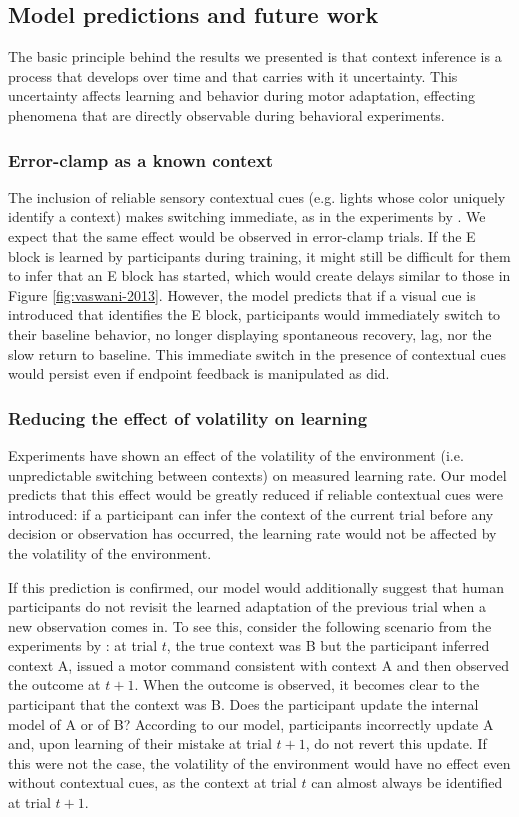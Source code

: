 \documentclass[a4paper,doc,floatsintext,natbib]{apa6}%
\def \fref #1{Figure \ref{#1}}     %
\begin{document}
\subsection{Model predictions and future work}
The basic principle behind the results we presented is that context inference is a process that develops over time and that carries with it uncertainty. This uncertainty affects learning and behavior during motor adaptation, effecting phenomena that are directly observable during behavioral experiments.

\subsubsection{Error-clamp as a known context}
The inclusion of reliable sensory contextual cues (e.g. lights whose color uniquely identify a context) makes switching immediate, as in the experiments by \cite{Kim_Neural_2015}. We expect that the same effect would be observed in error-clamp trials. If the E block is learned by participants during training, it might still be difficult for them to infer that an E block has started, which would create delays similar to those in \fref{fig:vaswani-2013}. However, the model predicts that if a visual cue is introduced that identifies the E block, participants would immediately switch to their baseline behavior, no longer displaying spontaneous recovery, lag, nor the slow return to baseline. This immediate switch in the presence of contextual cues would persist even if endpoint feedback is manipulated as \cite{Vaswani_Decay_2013} did.

\subsubsection{Reducing the effect of volatility on learning}
Experiments \citep{Herzfeld_memory_2014} have shown an effect of the volatility of the environment (i.e. unpredictable switching between contexts) on measured learning rate. Our model predicts that this effect would be greatly reduced if reliable contextual cues were introduced: if a participant can infer the context of the current trial before any decision or observation has occurred, the learning rate would not be affected by the volatility of the environment.

If this prediction is confirmed, our model would additionally suggest that human participants do not revisit the learned adaptation of the previous trial when a new observation comes in. To see this, consider the following scenario from the experiments by \cite{Herzfeld_memory_2014}: at trial $t$, the true context was B but the participant inferred context A, issued a motor command consistent with context A and then observed the outcome at $t + 1$. When the outcome is observed, it becomes clear to the participant that the context was B. Does the participant update the internal model of A or of B? According to our model, participants incorrectly update A and, upon learning of their mistake at trial $t+1$, do not revert this update. If this were not the case, the volatility of the environment would have no effect even without contextual cues, as the context at trial $t$ can almost always be identified at trial $t+1$.
\end{document}
